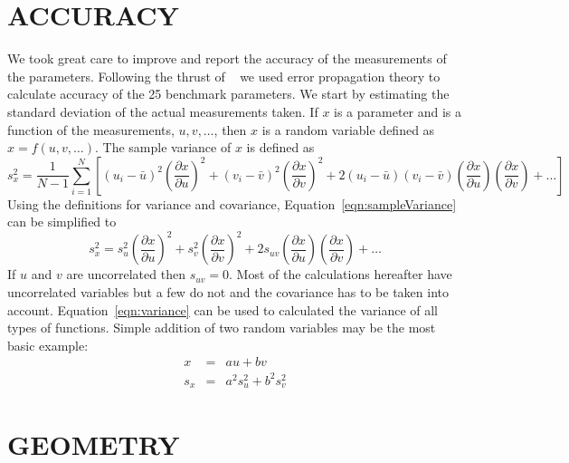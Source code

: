 \documentclass{bmd2010p}
\begin{document}
\section{ACCURACY}
We took great care to improve and report the accuracy of the
measurements of the parameters. Following the thrust of
~\cite{Roland1971} we used error propagation theory to calculate accuracy of
the 25 benchmark parameters. We start by estimating the standard deviation of
the actual measurements taken. If $x$ is a parameter and is a function of
the measurements, $u,v,\ldots$, then $x$ is a random variable defined as
$x=f(u,v,\ldots)$. The sample variance of $x$ is defined as
\begin{equation}
    s_x^2 =
    \frac{1}{N-1}\sum^N_{i=1}
    \left[(u_i - \bar{u})^2\left(\frac{\partial x}{\partial u}\right)^2 +
    (v_i - \bar{v})^2\left(\frac{\partial x}{\partial v}\right)^2 +
    2(u_i - \bar{u})(v_i - \bar{v})\left(\frac{\partial x}{\partial u}\right)\left(\frac{\partial x}{\partial v}\right)
    + \ldots\right]
    \label{eqn:sampleVariance}
\end{equation}
Using the definitions for variance and covariance,
Equation~\ref{eqn:sampleVariance} can be simplified to
\begin{equation}
    s_x^2 = s_u^2\left(\frac{\partial x}{\partial u}\right)^2 +
            s_v^2\left(\frac{\partial x}{\partial v}\right)^2 +
            2s_{uv}\left(\frac{\partial x}{\partial u}\right)\left(\frac{\partial x}{\partial v}\right)
            + \ldots
    \label{eqn:variance}
\end{equation}
If $u$ and $v$ are uncorrelated then $s_{uv}=0$. Most of the calculations
hereafter have uncorrelated variables but a few do not and the covariance has to
be taken into account. Equation~\ref{eqn:variance} can be
used to calculated the variance of all types of functions. Simple addition of
two random variables may be the most basic example:
\begin{eqnarray}
    \label{eqn:addition}
    x &=&  au + bv\\
    s_x &=& a^2s_u^2 + b^2s_v^2
\end{eqnarray}
\section{GEOMETRY}
\end{document}
